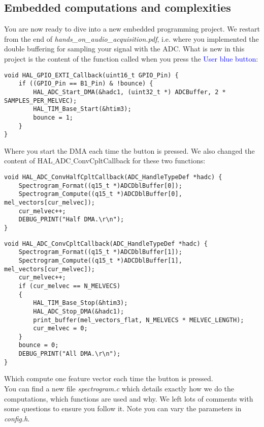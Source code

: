 \subsection{Embedded computations and complexities}
%
You are now ready to dive into a new embedded programming project. 
We restart from the end of \emph{hands\_on\_audio\_acquisition.pdf}, i.e. where you implemented the double buffering for sampling your signal with the ADC. What is new in this project is the content of the function called when you press the \textcolor{blue}{User blue button}: \\
%
\begin{lstlisting}
void HAL_GPIO_EXTI_Callback(uint16_t GPIO_Pin) {
	if ((GPIO_Pin == B1_Pin) & !bounce) {
		HAL_ADC_Start_DMA(&hadc1, (uint32_t *) ADCBuffer, 2 * SAMPLES_PER_MELVEC);
		HAL_TIM_Base_Start(&htim3);
		bounce = 1;
	}
}
\end{lstlisting}
%
Where you start the DMA each time the button is pressed. We also changed the content of \newline HAL$\_$ADC$\_$ConvCpltCallback for these two functions:
%
\begin{lstlisting}
void HAL_ADC_ConvHalfCpltCallback(ADC_HandleTypeDef *hadc) {
	Spectrogram_Format((q15_t *)ADCDblBuffer[0]);
	Spectrogram_Compute((q15_t *)ADCDblBuffer[0], mel_vectors[cur_melvec]);
	cur_melvec++;
	DEBUG_PRINT("Half DMA.\r\n");
}
\end{lstlisting}
\begin{lstlisting}
void HAL_ADC_ConvCpltCallback(ADC_HandleTypeDef *hadc) {
	Spectrogram_Format((q15_t *)ADCDblBuffer[1]);
	Spectrogram_Compute((q15_t *)ADCDblBuffer[1], mel_vectors[cur_melvec]);
	cur_melvec++;
	if (cur_melvec == N_MELVECS)
	{
		HAL_TIM_Base_Stop(&htim3);
		HAL_ADC_Stop_DMA(&hadc1);
		print_buffer(mel_vectors_flat, N_MELVECS * MELVEC_LENGTH);
		cur_melvec = 0;
	}
	bounce = 0;
	DEBUG_PRINT("All DMA.\r\n");
}
\end{lstlisting}
%
Which compute one feature vector each time the button is pressed. \\
You can find a new file \emph{spectrogram.c} which details exactly how we do the computations, which functions are used and why. We left lots of comments with some questions to ensure you follow it. Note you can vary the parameters in \emph{config.h}. \\
\\

